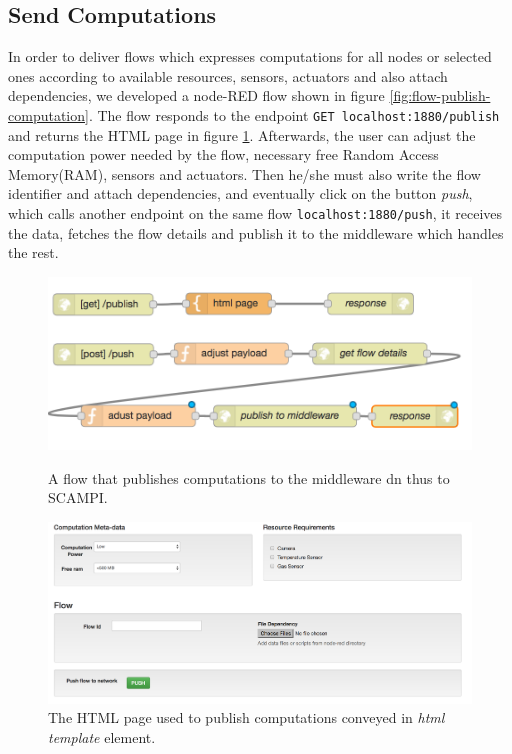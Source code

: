 \subsection{Send Computations}
In order to deliver flows which expresses computations for all nodes or selected ones according to available resources,  sensors, actuators and also attach dependencies, we developed a node-RED flow shown in figure \ref{fig:flow-publish-computation}. The flow responds to the endpoint \verb|GET localhost:1880/publish| and returns the HTML page in figure \ref{fig:html-publish}. Afterwards, the user can adjust the computation power needed by the flow, necessary free Random Access Memory(RAM), sensors and actuators. Then he/she must also write the flow identifier and attach dependencies, and eventually click on the button \textit{push}, which calls another endpoint on the same flow \verb|localhost:1880/push|, it receives the data, fetches the flow details and publish it to the middleware which handles the rest.
 \begin{figure}[H]
	\centering
	\includegraphics[scale=0.6]{images/flow-publish-computation.png}
	\caption{A flow that publishes computations to the middleware dn thus to SCAMPI.}
	\label{fig:flow-publish-computation}
	\centering
	\includegraphics[scale=0.4]{images/html-publish.png}
	\caption{The HTML page used to publish computations conveyed in \textit{html template} element.}
	\label{fig:html-publish}
\end{figure}


